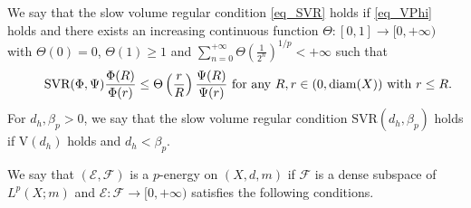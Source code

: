 \documentclass[11pt,a4paper]{article}
\numberwithin{equation}{section}
\theoremstyle{plain}
\theoremstyle{definition}
\begin{document}
We say that the slow volume regular condition \ref{eq_SVR} holds if \ref{eq_VPhi} holds and there exists an increasing continuous function $\Theta:[0,1]\to[0,+\infty)$ with $\Theta(0)=0$, $\Theta(1)\ge1$ and $\sum_{n=0}^{+\infty}\Theta(\frac{1}{2^n})^{1/p}<+\infty$ such that
\begin{equation*}\label{eq_SVR}\tag*{$\text{SVR}(\Phi,\Psi)$}
\frac{\Phi(R)}{\Phi(r)}\le\Theta\left(\frac{r}{R}\right)\frac{\Psi(R)}{\Psi(r)}
\text{ for any }R,r\in(0,\mathrm{diam}(X))\text{ with }r\le R.
\end{equation*}
For $d_h,\beta_p>0$, we say that the slow volume regular condition \hypertarget{eq_SVRdb}{$\text{SVR}(d_h,\beta_p)$} holds if \hyperlink{eq_Vdh}{$\text{V}(d_h)$} holds and $d_h<\beta_p$.

We say that $(\mathcal{E},\mathcal{F})$ is a $p$-energy on $(X,d,m)$ if $\mathcal{F}$ is a dense subspace of $L^p(X;m)$ and $\mathcal{E}:\mathcal{F}\to[0,+\infty) $ satisfies the following conditions.
\end{document}
